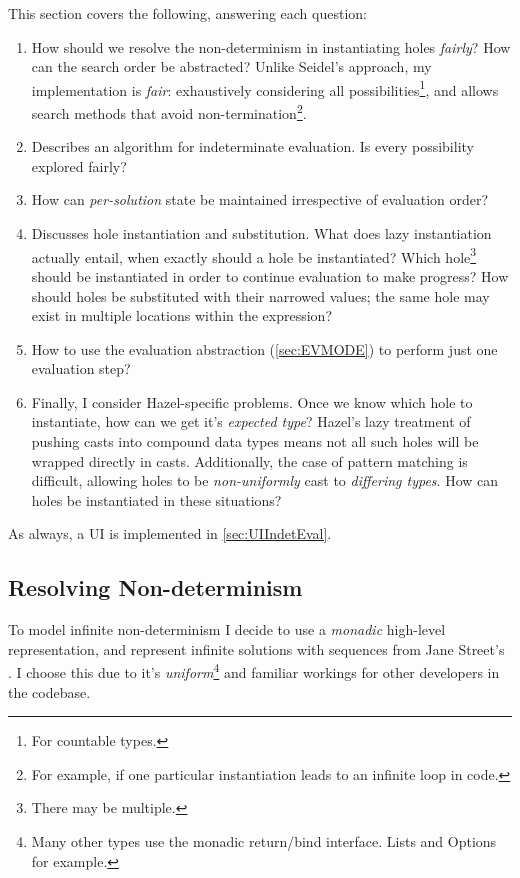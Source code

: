 This section covers the following, answering each question:
\begin{enumerate}
\item[\ref{sec:ResolvingNondeterminism}] How should we resolve the non-determinism in instantiating holes \textit{fairly}? How can the search order be abstracted? Unlike Seidel's approach, my implementation is \textit{fair}: exhaustively considering all possibilities\footnote{For countable types.}, and allows search methods that avoid non-termination\footnote{For example, if one particular instantiation leads to an infinite loop in code.}.
\item[\ref{sec:IndetEvalAlgorithm}] Describes an algorithm for indeterminate evaluation. Is every possibility explored fairly?
\item[\ref{sec:ThreadingState}] How can \textit{per-solution} state be maintained irrespective of evaluation order?
\item[\ref{sec:HoleInstantiation}] Discusses hole instantiation and substitution. What does lazy instantiation actually entail, when exactly should a hole be instantiated? Which hole\footnote{There may be multiple.} should be instantiated in order to continue evaluation to make progress? How should holes be substituted with their narrowed values; the same hole may exist in multiple locations within the expression?
\item[\ref{sec:OneStepEvaluator}] How to use the evaluation abstraction (\cref{sec:EVMODE}) to perform just one evaluation step?
\item[\ref{sec:TypesForHoles}] Finally, I consider Hazel-specific problems. Once we know which hole to instantiate, how can we get it's \textit{expected type}? Hazel's lazy treatment of pushing casts into compound data types means not all such holes will be wrapped directly in casts. Additionally, the case of pattern matching is difficult, allowing holes to be \textit{non-uniformly} cast to \textit{differing types}. How can holes be instantiated in these situations?
\end{enumerate}
As always, a UI is implemented in \cref{sec:UIIndetEval}.

\subsection{Resolving Non-determinism}
\label{sec:ResolvingNondeterminism}
To model infinite non-determinism I decide to use a \textit{monadic} high-level representation, and represent infinite solutions with sequences from Jane Street's . I choose this due to it's \textit{uniform}\footnote{Many other types use the monadic return/bind interface. Lists and Options for example.} and familiar workings for other developers in the codebase. 

